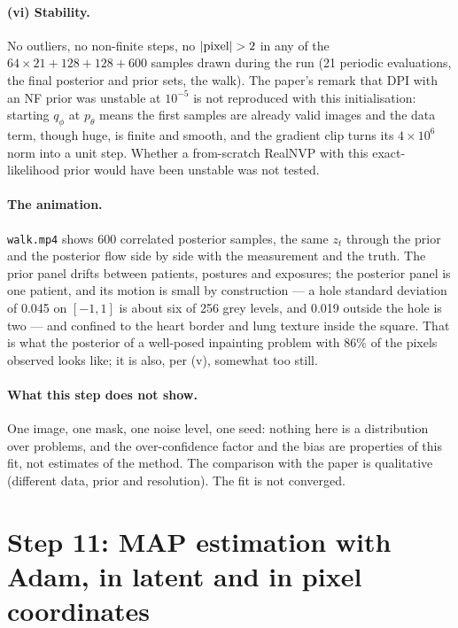 \documentclass[11pt]{article}
\begin{document}
\paragraph{(vi) Stability.} No outliers, no non-finite steps, no
$|{\rm pixel}| > 2$ in any of the $64 \times 21 + 128 + 128 + 600$ samples
drawn during the run (21 periodic evaluations, the final posterior and prior
sets, the walk). The paper's remark that DPI with an NF prior was
unstable at $10^{-5}$ is not reproduced with this initialisation: starting
$q_\phi$ at $p_\theta$ means the first samples are already valid images and the
data term, though huge, is finite and smooth, and the gradient clip
turns its $4 \times 10^{6}$ norm into a unit step. Whether a from-scratch
RealNVP with this exact-likelihood prior would have been unstable was not
tested.

\paragraph{The animation.} \texttt{walk.mp4} shows 600 correlated
posterior samples, the same $z_t$ through the prior and the posterior flow
side by side with the measurement and the truth. The prior panel drifts
between patients, postures and exposures; the posterior panel is one
patient, and its motion is small by construction --- a hole standard
deviation of 0.045 on $[-1, 1]$ is about six of 256 grey levels, and 0.019
outside the hole is two --- and confined to the heart border and lung
texture inside the square. That is what the posterior of a well-posed
inpainting problem with 86\% of the pixels observed looks like; it is also,
per (v), somewhat too still.

\paragraph{What this step does not show.} One image, one mask, one noise
level, one seed: nothing here is a distribution over problems, and the
over-confidence factor and the bias are properties of this fit, not
estimates of the method. The comparison with the paper is qualitative
(different data, prior and resolution). The fit is not converged.

\section{Step 11: MAP estimation with Adam, in latent and in pixel coordinates}
\label{sec:step11}
\end{document}
